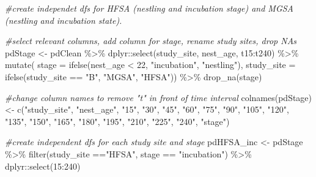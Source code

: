 \documentclass[
]{article}
\newenvironment{Shaded}{\begin{snugshade}}{\end{snugshade}}
\newcommand{\AttributeTok}[1]{\textcolor[rgb]{0.77,0.63,0.00}{#1}}
\newcommand{\CommentTok}[1]{\textcolor[rgb]{0.56,0.35,0.01}{\textit{#1}}}
\newcommand{\DecValTok}[1]{\textcolor[rgb]{0.00,0.00,0.81}{#1}}
\newcommand{\FunctionTok}[1]{\textcolor[rgb]{0.00,0.00,0.00}{#1}}
\newcommand{\NormalTok}[1]{#1}
\newcommand{\OtherTok}[1]{\textcolor[rgb]{0.56,0.35,0.01}{#1}}
\newcommand{\SpecialCharTok}[1]{\textcolor[rgb]{0.00,0.00,0.00}{#1}}
\newcommand{\StringTok}[1]{\textcolor[rgb]{0.31,0.60,0.02}{#1}}
\begin{document}
\begin{Shaded}
\begin{Highlighting}[]
\CommentTok{\#create independet dfs for HFSA (nestling and incubation stage) and MGSA (nestling and incubation state). }

\CommentTok{\#select relevant columns, add column for stage, rename study sites, drop NAs}
\NormalTok{pdStage }\OtherTok{\textless{}{-}}\NormalTok{ pdClean }\SpecialCharTok{\%\textgreater{}\%}
\NormalTok{  dplyr}\SpecialCharTok{::}\FunctionTok{select}\NormalTok{(study\_site, nest\_age, t15}\SpecialCharTok{:}\NormalTok{t240) }\SpecialCharTok{\%\textgreater{}\%}
  \FunctionTok{mutate}\NormalTok{(}
    \AttributeTok{stage =}
      \FunctionTok{ifelse}\NormalTok{(nest\_age }\SpecialCharTok{\textless{}} \DecValTok{22}\NormalTok{, }\StringTok{"incubation"}\NormalTok{, }\StringTok{"nestling"}\NormalTok{),}
    \AttributeTok{study\_site =}
      \FunctionTok{ifelse}\NormalTok{(study\_site }\SpecialCharTok{==} \StringTok{"B"}\NormalTok{, }\StringTok{"MGSA"}\NormalTok{, }\StringTok{"HFSA"}\NormalTok{)) }\SpecialCharTok{\%\textgreater{}\%}
  \FunctionTok{drop\_na}\NormalTok{(stage)}

\CommentTok{\#change column names to remove "t" in front of time interval}
\FunctionTok{colnames}\NormalTok{(pdStage) }\OtherTok{\textless{}{-}} \FunctionTok{c}\NormalTok{(}\StringTok{"study\_site"}\NormalTok{, }\StringTok{"nest\_age"}\NormalTok{, }\StringTok{"15"}\NormalTok{, }\StringTok{"30"}\NormalTok{, }\StringTok{"45"}\NormalTok{, }\StringTok{"60"}\NormalTok{, }\StringTok{"75"}\NormalTok{, }\StringTok{"90"}\NormalTok{, }\StringTok{"105"}\NormalTok{, }\StringTok{"120"}\NormalTok{, }\StringTok{"135"}\NormalTok{, }\StringTok{"150"}\NormalTok{, }\StringTok{"165"}\NormalTok{, }\StringTok{"180"}\NormalTok{, }\StringTok{"195"}\NormalTok{, }\StringTok{"210"}\NormalTok{, }\StringTok{"225"}\NormalTok{, }\StringTok{"240"}\NormalTok{, }\StringTok{"stage"}\NormalTok{)}

\CommentTok{\#create independent dfs for each study site and stage}
\NormalTok{pdHFSA\_inc }\OtherTok{\textless{}{-}}\NormalTok{ pdStage }\SpecialCharTok{\%\textgreater{}\%}
  \FunctionTok{filter}\NormalTok{(study\_site }\SpecialCharTok{==}\StringTok{"HFSA"}\NormalTok{, stage }\SpecialCharTok{==} \StringTok{"incubation"}\NormalTok{) }\SpecialCharTok{\%\textgreater{}\%}
\NormalTok{  dplyr}\SpecialCharTok{::}\FunctionTok{select}\NormalTok{(}\StringTok{\textquotesingle{}15\textquotesingle{}}\SpecialCharTok{:}\StringTok{\textquotesingle{}240\textquotesingle{}}\NormalTok{)}


\end{Highlighting}
\end{Shaded}
\end{document}
